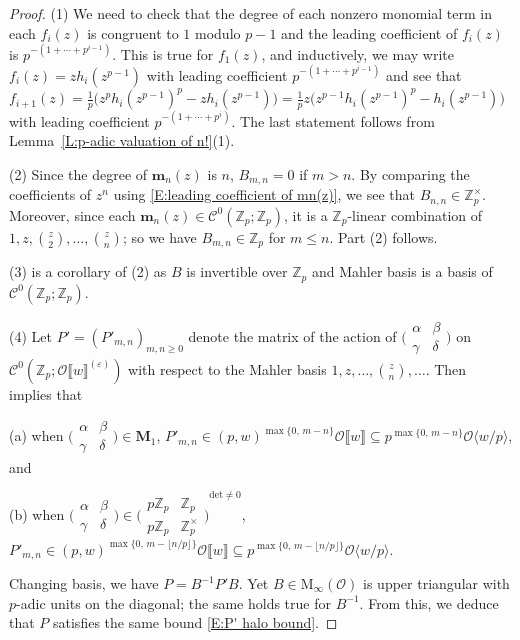 \documentclass[12pt]{amsart}
\theoremstyle{definition}
\numberwithin{equation}{subsection}
\def\calC{\mathcal{C}}
\def\calO{\mathcal{O}}
\def\ZZ{\mathbb{Z}}
\def\bfm{\mathbf{m}}
\def\bfM{\mathbf{M}}
\def\rmM{\mathrm{M}}
\renewcommand{\det}{\mathrm{det}}
\newcommand{\Matrix}[4]{{\big(\begin{smallmatrix}#1&#2\\#3& #4\end{smallmatrix} \big)}}
\begin{document}
\begin{proof}
(1) We need to check that the degree of each nonzero monomial term in each $f_i(z)$ is congruent to $1$ modulo $p-1$ and the leading coefficient of $f_i(z)$ is $p^{-(1+\cdots+p^{i-1})}$. This is true for $f_1(z)$, and inductively, we may write $f_i(z) = zh_i(z^{p-1})$ with leading coefficient $p^{-(1+\cdots+p^{i-1})}$  and see that $f_{i+1}(z) = \frac  1p \big( z^ph_i(z^{p-1})^p - zh_i(z^{p-1}) \big)= \frac 1p z \big(z^{p-1}h_i(z^{p-1})^p - h_i(z^{p-1})\big)$ with leading coefficient $p^{-(1+\cdots+p^{i})}$. The last statement follows from  Lemma~\ref{L:p-adic valuation of n!}(1).

(2) 
Since the degree of $\bfm_n(z)$ is $n$, $B_{m,n}=0$ if $m>n$.
By comparing the coefficients of $z^n$ using \eqref{E:leading coefficient of mn(z)}, we see that $B_{n,n}\in \ZZ_p^\times$. Moreover, since each $\bfm_n(z) \in \calC^0(\ZZ_p;\ZZ_p)$, it is a $\ZZ_p$-linear combination of $1, z, \binom z2, \dots, \binom zn$; so we have $B_{m,n} \in \ZZ_p$ for $m \leq n$. Part (2) follows.

(3) is a corollary of (2) as $B$ is invertible over $\ZZ_p$ and Mahler basis is a basis of $\calC^0(\ZZ_p; \ZZ_p)$.

(4) Let $P'= (P'_{m,n})_{m,n \geq 0}$ denote the matrix of the action of $\Matrix \alpha \beta \gamma \delta$ on $\calC^0(\ZZ_p; \calO\llbracket w \rrbracket^{(\varepsilon)})$ with respect to the Mahler basis $1, z, \dots, \binom zn, \dots$. Then \cite[Proposition~3.14\,(1)]{liu-wan-xiao} implies that

(a) when $\Matrix \alpha \beta \gamma \delta \in \bfM_1$,
 $P'_{m,n} \in (p,w)^{\max\{0,\,m-n\}}\calO\llbracket w\rrbracket \subseteq p^{\max\{0,\,m-n\}} \calO\langle w/p\rangle$, and 

(b) when $\Matrix \alpha \beta \gamma \delta \in \Matrix{p\ZZ_p}{\ZZ_p}{p\ZZ_p}{\ZZ_p^\times}^{\det \neq 0}$, $P'_{m,n} \in (p,w)^{\max\{0,\,m- \lfloor n/p\rfloor \}}\calO\llbracket w\rrbracket \subseteq p^{\max\{0,\,m-\lfloor n/p\rfloor \}} \calO\langle w/p\rangle$.  

Changing basis, we have $P = B^{-1}P'B$. Yet $B \in \rmM_\infty(\calO)$ is upper triangular with $p$-adic units on the diagonal; the same holds true for $B^{-1}$. From this, we deduce that $P$ satisfies the same bound \eqref{E:P' halo bound}.
\end{proof}
\end{document}
